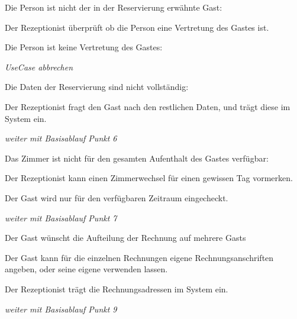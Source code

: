 \begin{longenum}
	\begin{longenum}
		\item Die Person ist nicht der in der \Gls{Reservierung} erwähnte Gast:
		\begin{longenum}
			\item Der \Gls{Rezeptionist} überprüft ob die Person eine Vertretung des \Gls{Gast}es ist.
			\begin{longenum}
				\item Die Person ist keine Vertretung des \Gls{Gast}es:
				\begin{longenum}
					\item \emph{UseCase abbrechen}
				\end{longenum}
			\end{longenum}
		\end{longenum}
	\end{longenum}
	\item
	\begin{longenum}
		\item Die Daten der \Gls{Reservierung} sind nicht vollständig:
		\begin{longenum}
			\item Der \Gls{Rezeptionist} fragt den \Gls{Gast} nach den restlichen Daten, und trägt diese im System ein.
			\item \emph{weiter mit Basisablauf Punkt 6}
		\end{longenum}
	\end{longenum}
	\item
	\begin{longenum}
		\item Das \Gls{Zimmer} ist nicht für den gesamten Aufenthalt des \Gls{Gast}es verfügbar:
		\begin{longenum}
			\item Der \Gls{Rezeptionist} kann einen \Gls{Zimmer}wechsel für einen gewissen Tag vormerken.
			\item Der \Gls{Gast} wird nur für den verfügbaren Zeitraum eingecheckt.
			\item \emph{weiter mit Basisablauf Punkt 7}
		\end{longenum}
	\end{longenum}
	\item
	\item
	\begin{longenum}
		\item Der \Gls{Gast} wünscht die Aufteilung der Rechnung auf mehrere \Glspl{Gast}
		\begin{longenum}
			\item Der \Gls{Gast} kann für die einzelnen Rechnungen eigene Rechnungsanschriften angeben, oder seine eigene verwenden lassen.
			\item Der \Gls{Rezeptionist} trägt die Rechnungsadressen im System ein.
			\item \emph{weiter mit Basisablauf Punkt 9}
		\end{longenum}
	\end{longenum}
	\item
\end{longenum}


